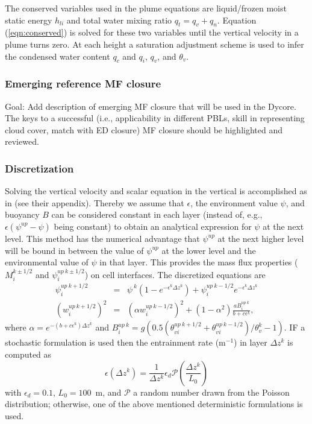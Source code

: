\documentclass[dvipdfmx,a4paper,10pt]{article}
\begin{document}
The conserved variables used in the plume equations are liquid/frozen moist static energy $h_{li}$ and total water mixing ratio $q_t=q_v+q_n$. Equation (\ref{eqn:conserved}) is solved for these two variables until the vertical velocity in a plume turns zero. At each height a saturation adjustment scheme is used to infer the condensed water content $q_c$ and $q_i$, $q_v$, and $\theta_v$. 

\subsubsection{Emerging reference MF closure}

{\color{blue} Goal: Add description of emerging MF closure that will be used in the Dycore. The keys to a successful (i.e., applicability in different PBLs, skill in representing cloud cover, match with ED closure) MF closure should be highlighted and reviewed.}

\subsubsection{Discretization}
Solving the vertical velocity and scalar equation in the vertical is accomplished as in \cite{suselj14} (see their appendix). Thereby we assume that $\epsilon$, the environment value $\psi$, and buoyancy $B$ can be considered constant in each layer (instead of, e.g., $\epsilon(\psi^{up}-\psi)$ being constant) to obtain an analytical expression for $\psi$ at the next level. This method has the numerical advantage that $\psi^{up}$ at the next higher level will be bound in between the value of $\psi^{up}$ at the lower level and the environmental value of $\psi$ in that layer. This provides the mass flux properties ($M_i^{k\pm 1/2}$ and $\psi^{up~k\pm 1/2}_i$) on cell interfaces. The discretized equations are 
\begin{eqnarray}
 \psi_i^{up~k+1/2}&=&\psi^{~k}(1-e^{-\epsilon^{k}\Delta z^k})+\psi_i^{up~k-1/2}e^{-\epsilon^{k}\Delta z^k}\\
 (w_i^{up~k+1/2})^2&=&(\alpha w_i^{up~k-1/2})^2 + (1-\alpha^2) \frac{aB_i^{up~k}}{b+c\epsilon^k},
\end{eqnarray}
where $\alpha=e^{-(b+c\epsilon^k)\Delta z^k}$ and $B_i^{up~k}=g(0.5(\theta_{vi}^{up~k+1/2}+\theta_{vi}^{up~k-1/2})/\theta_v^{k}-1)$. IF a stochastic formulation is used then the entrainment rate (m$^{-1}$) in layer $\Delta z^k$ is computed as
\begin{equation}
 \epsilon(\Delta z^k) = \frac{1}{\Delta z^k} \epsilon_d \mathcal{P}(\frac{\Delta z^k}{L_0})
\end{equation}
with $\epsilon_d=0.1$, $L_0=100$~m, and $\mathcal{P}$ a random number drawn from the Poisson distribution; otherwise, one of the above mentioned deterministic formulations is used. 
\end{document}
